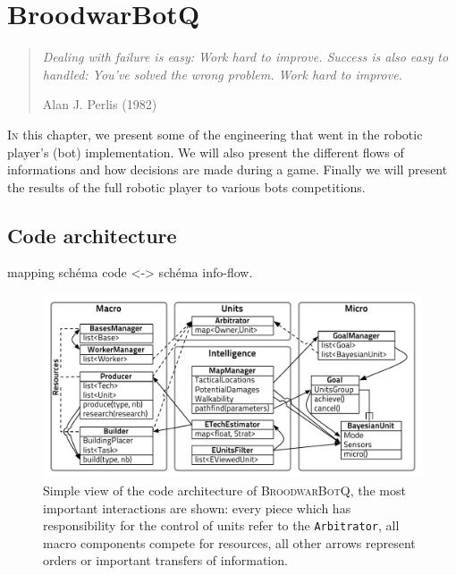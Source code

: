 \chapter{BroodwarBotQ}%
\label{chapter:bot}



\begin{quotation}
\textit{Dealing with failure is easy: Work hard to improve. Success is also easy to handled: You've solved the wrong problem. Work hard to improve.}\\
\begin{flushright}Alan J. Perlis (1982)\end{flushright}
\end{quotation}

\lettrine{I}{n} this chapter, we present some of the engineering that went in the robotic player's (bot) implementation. We will also present the different flows of informations and how decisions are made during a game. Finally we will present the results of the full robotic player to various bots competitions.




\citep{Wolfe11} %

\section{Code architecture}

\label{sec:codearchitecture}
mapping schéma code <-> schéma info-flow.

\begin{figure}[h]
\begin{center}
\includegraphics[width=16cm]{images/BBQEarly2012.pdf}
\caption{Simple view of the code architecture of \textsc{BroodwarBotQ}, the most important interactions are shown: every piece which has responsibility for the control of units refer to the \texttt{Arbitrator}, all macro components compete for resources, all other arrows represent orders or important transfers of information.}
\label{fig:codearchitecture}
\end{center}
\end{figure}

